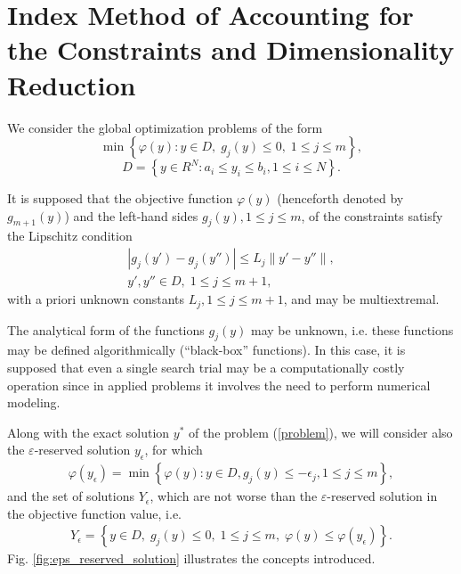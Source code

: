 \documentclass[twocolumn]{svjour3}          %
\begin{document}
\section{Index Method of Accounting for the Constraints and Dimensionality Reduction}
\label{sec:2}
	We consider the global optimization problems of the form
\begin{equation}\label{problem}
	\min{\left\{\varphi(y):y \in D, \; g_j(y)\leq 0, \; 1 \leq j \leq m\right\}},
\end{equation}
\begin{equation}\label{D}
	D=\left\{y\in R^N: a_i\leq y_i \leq b_i, 1\leq i \leq N\right\}.
\end{equation}

	It is supposed that the objective function $\varphi(y)$ (henceforth denoted by $g_{m+1}(y)$) and the left-hand sides $g_{j}(y), 1 \leq j \leq m$, of the constraints satisfy the Lipschitz condition
\begin{align}\label{lipschitz_condition}
	\left|g_j(y')-g_j (y'')\right| \leq L_j \|y'-y''\|, \nonumber \\ 
	y', y''\in D, \; 1\leq j \leq m+1,
\end{align}
with a priori unknown constants $L_j, 1\leq j \leq m+1$, and may be multiextremal.

	The analytical form of the functions $g_{j}(y)$ may be unknown, i.e. these functions may be defined algorithmically (“black-box” functions). In this case, it is supposed that even a single search trial may be a computationally costly operation since in applied problems it involves the need to perform numerical modeling. 
	
	Along with the exact solution $y^\ast$ of the problem (\ref{problem}), we will consider also the $\varepsilon$-reserved solution $y_{\epsilon}$, for which 
\small
\begin{align}\label{epsilon_reserved_solution}
	\varphi(y_{\epsilon}) = \min{\left\{\varphi(y):y \in D, g_j(y)\leq -{\epsilon}_j, 1 \leq j \leq m\right\}},
\end{align}
\normalsize
and the set of solutions $Y_{\epsilon}$, which are not worse than the $\varepsilon$-reserved solution in the objective function value, i.e.
\small
\begin{align}\label{Y_epsilon}
	Y_{\epsilon} = \left\{ y \in D, \; g_j(y) \leq 0, \; 1 \leq j \leq m, \; \varphi(y) \leq \varphi(y_{\epsilon}) \right\}.
\end{align}
\normalsize
Fig. \ref{fig:eps_reserved_solution} illustrates the concepts introduced.
\end{document}
